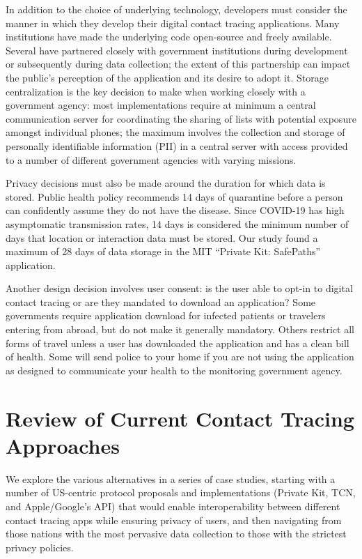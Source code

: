\documentclass{article}
\begin{document}
In addition to the choice of underlying technology, developers must consider the manner in which they develop their digital contact tracing applications. Many institutions have made the underlying code open-source and freely available. Several have partnered closely with government institutions during development or subsequently during data collection; the extent of this partnership can impact the public’s perception of the application and its desire to adopt it. Storage centralization is the key decision to make when working closely with a government agency: most implementations require at minimum a central communication server for coordinating the sharing of lists with potential exposure amongst individual phones; the maximum involves the collection and storage of personally identifiable information (PII) in a central server with access provided to a number of different government agencies with varying missions.

Privacy decisions must also be made around the duration for which data is stored. Public health policy recommends 14 days of quarantine before a person can confidently assume they do not have the disease. Since COVID-19 has high asymptomatic transmission rates, 14 days is considered the minimum number of days that location or interaction data must be stored. Our study found a maximum of 28 days of data storage in the MIT “Private Kit: SafePaths” application.

Another design decision involves user consent: is the user able to opt-in to digital contact tracing or are they mandated to download an application? Some governments require application download for infected patients or travelers entering from abroad, but do not make it generally mandatory. Others restrict all forms of travel unless a user has downloaded the application and has a clean bill of health. Some will send police to your home if you are not using the application as designed to communicate your health to the monitoring government agency.

\section{Review of Current Contact Tracing Approaches}

We explore the various alternatives in a series of case studies, starting with a number of US-centric protocol proposals and implementations (Private Kit, TCN, and Apple/Google's API) that would enable interoperability between different contact tracing apps while ensuring privacy of users, and then navigating from those nations with the most pervasive data collection to those with the strictest privacy policies.
\end{document}
